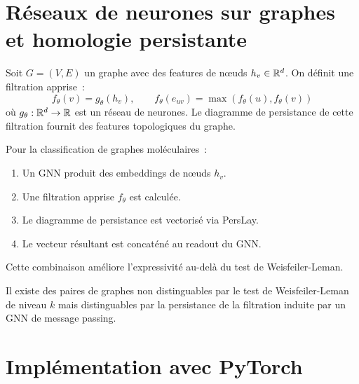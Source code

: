 \section{R\'eseaux de neurones sur graphes et homologie persistante}
\label{sec:gnn_persistance}

\begin{definition}
Soit $G = (V, E)$ un graphe avec des features de n\oe uds
$h_v \in \mathbb{R}^d$. On d\'efinit une filtration apprise~:
\[
  f_\theta(v) = g_\theta(h_v), \qquad
  f_\theta(e_{uv}) = \max(f_\theta(u), f_\theta(v))
\]
o\`u $g_\theta : \mathbb{R}^d \to \mathbb{R}$ est un r\'eseau de neurones.
Le diagramme de persistance de cette filtration fournit des
features topologiques du graphe.
\end{definition}

\begin{exemple}
Pour la classification de graphes mol\'eculaires~:
\begin{enumerate}
  \item Un GNN produit des embeddings de n\oe uds $h_v$.
  \item Une filtration apprise $f_\theta$ est calcul\'ee.
  \item Le diagramme de persistance est vectoris\'e via PersLay.
  \item Le vecteur r\'esultant est concat\'en\'e au readout du GNN.
\end{enumerate}
Cette combinaison am\'eliore l'expressivit\'e au-del\`a du test
de Weisfeiler-Leman.
\end{exemple}

\begin{theoreme}
Il existe des paires de graphes non distinguables par le test de
Weisfeiler-Leman de niveau $k$ mais distinguables par la
persistance de la filtration induite par un GNN de message passing.
\end{theoreme}

\section{Impl\'ementation avec PyTorch}
\label{sec:implementation}

